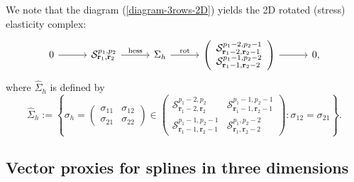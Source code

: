 \documentclass[final]{amsart}%
\newcommand{\0}{\mathaccent23}
\newcommand\rot{\operatorname{rot}}
\newcommand\hess{\operatorname{hess}}
\newcommand{\br}{\mathbf r}
\begin{document}
We note that the diagram (\ref{diagram-3rows-2D}) yields the 2D rotated (stress) elasticity complex:
\begin{equation}\label{complex-2Dstress-rotated}
\begin{tikzcd}[column sep=0.4in]
0 \arrow{r} &\mathcal S_{\br_1, \br_2}^{p_1, p_2} \arrow{r}{\hess} &
\Sigma_h
 \arrow{r}{\rot}  &\left (
\begin{array}{c}
\mathcal S_{\br_1-2, \br_2-1}^{p_1-2, p_2-1}\\
\mathcal S_{\br_1-1, \br_2-2}^{p_1-1, p_2-2}
\end{array}
\right)  \arrow{r}{} & 0,
 \end{tikzcd}
\end{equation}
where $\hat{\Sigma}_h$ is defined by
$$
\hat{\Sigma}_h:=\left\{\sigma_{h}=
\begin{pmatrix}
\sigma_{11} & \sigma_{12}\\
\sigma_{21} & \sigma_{22}
\end{pmatrix}
\in \begin{pmatrix}
\mathcal S_{\br_1-2, \br_2}^{p_1-2, p_2} &\mathcal S_{\br_1-1, \br_2-1}^{p_1-1, p_2-1} \\
\mathcal S_{\br_1-1, \br_2-1}^{p_1-1, p_2-1} &\mathcal S_{\br_1, \br_2-2}^{p_1, p_2-2}
\end{pmatrix} : \sigma_{12}=\sigma_{21}\right\}.
$$

\subsection{Vector proxies for splines in three dimensions}
\end{document}
